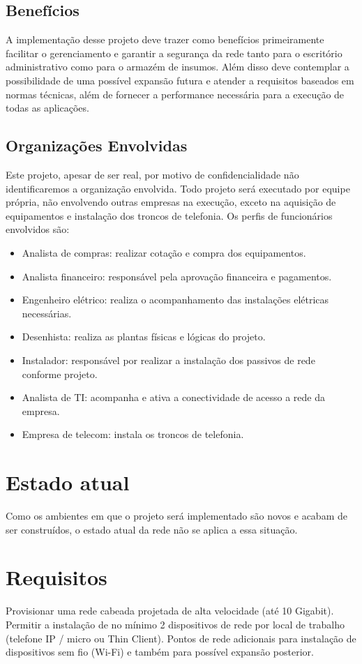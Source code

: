 \documentclass[	DIV=calc,%
							paper=a4,%
							fontsize=12pt,%
							onecolumn]{scrartcl}	 					%
\begin{document}
\subsection{Benefícios}
A implementação desse projeto deve trazer como benefícios primeiramente facilitar o gerenciamento e garantir a segurança da rede tanto para o escritório administrativo como para o armazém de insumos. Além disso deve contemplar a possibilidade de uma possível expansão futura e atender a requisitos baseados em normas técnicas, além de fornecer a performance necessária para a execução de todas as aplicações.

\subsection{Organizações Envolvidas}
Este projeto, apesar de ser real, por motivo de confidencialidade não identificaremos a organização envolvida. Todo projeto será executado por equipe própria, não envolvendo outras empresas na execução, exceto na aquisição de equipamentos e instalação dos troncos de telefonia. Os perfis de funcionários envolvidos são:
\begin{itemize}
	\item Analista de compras: realizar cotação e compra dos equipamentos. 
	\item Analista financeiro: responsável pela aprovação financeira e pagamentos.
	\item Engenheiro elétrico: realiza o acompanhamento das instalações elétricas necessárias. 
	\item Desenhista: realiza as plantas físicas e lógicas do projeto. 
	\item Instalador: responsável por realizar a instalação dos passivos de rede conforme projeto. 
	\item Analista de TI: acompanha e ativa a conectividade de acesso a rede da empresa. 
	\item Empresa de telecom: instala os troncos de telefonia.  
\end{itemize}


\section{Estado atual}
Como os ambientes em que o projeto será implementado são novos e acabam de ser construídos, o estado atual da rede não se aplica a essa situação. 

\section{Requisitos}
Provisionar uma rede cabeada projetada de alta velocidade (até 10 Gigabit). Permitir a instalação de no mínimo 2 dispositivos de rede por local de trabalho (telefone IP / micro ou Thin Client). Pontos de rede adicionais para instalação de dispositivos sem fio (Wi-Fi) e também para possível expansão posterior. 
\end{document}
